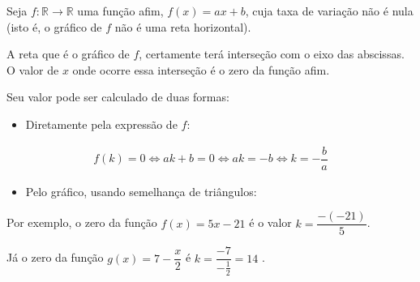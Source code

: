 \begin{observation}{}

Seja \(f:\mathbb{R}\to\mathbb{R}\) uma função afim, \(f(x)=ax+b\), cuja taxa de variação não é nula (isto é, o gráfico de \(f\) não é uma reta horizontal).

A reta que é o gráfico de \(f\), certamente terá interseção com o eixo das abscissas. O valor de \(x\) onde ocorre essa interseção é o zero da função afim.

Seu valor pode ser calculado de duas formas:
\begin{itemize}
\item {} 
Diretamente pela expressão de \(f\):

\end{itemize}
\begin{equation*}
\begin{split}f(k)=0 \Longleftrightarrow ak+b=0 \Longleftrightarrow ak=-b \Longleftrightarrow k=-\dfrac ba\end{split}
\end{equation*}\begin{itemize}
\item {} 
Pelo gráfico, usando semelhança de triângulos:

\end{itemize}

\begin{figure}[H]
\centering

\end{figure}

Por exemplo, o zero da função \(f(x)=5x-21\) é o valor \(k=\dfrac{-(-21)}5\).

Já o zero da função \(g(x)=7-\dfrac x2\) é \(k=\dfrac{-7}{-\frac 12}=14\) .
\end{observation}

